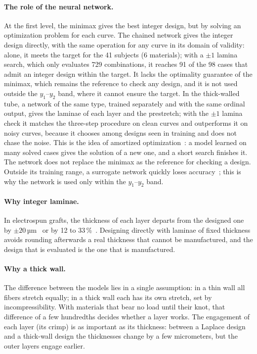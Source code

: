 \paragraph{The role of the neural network.} At the first level, the minimax gives the best integer design, but by solving an optimization problem for each curve. The chained network gives the integer design directly, with the same operation for any curve in its domain of validity: alone, it meets the target for the 41 subjects (6 materials); with a $\pm1$ lamina search, which only evaluates 729 combinations, it reaches 91 of the 98 cases that admit an integer design within the target. It lacks the optimality guarantee of the minimax, which remains the reference to check any design, and it is not used outside the $y_1$--$y_2$ band, where it cannot ensure the target. In the thick-walled tube, a network of the same type, trained separately and with the same ordinal output, gives the laminae of each layer and the prestretch; with the $\pm1$ lamina check it matches the three-step procedure on clean curves and outperforms it on noisy curves, because it chooses among designs seen in training and does not chase the noise. This is the idea of amortized optimization~\cite{amos}: a model learned on many solved cases gives the solution of a new one, and a short search finishes it. The network does not replace the minimax as the reference for checking a design. Outside its training range, a surrogate network quickly loses accuracy~\cite{utrera}; this is why the network is used only within the $y_1$--$y_2$ band.

\paragraph{Why integer laminae.} In electrospun grafts, the thickness of each layer departs from the designed one by $\pm20$\,µm~\cite{harrison} or by 12 to 33\,\%~\cite{tamimi}. Designing directly with laminae of fixed thickness avoids rounding afterwards a real thickness that cannot be manufactured, and the design that is evaluated is the one that is manufactured.

\paragraph{Why a thick wall.} The difference between the models lies in a single assumption: in a thin wall all fibers stretch equally; in a thick wall each has its own stretch, set by incompressibility. With materials that bear no load until their knot, that difference of a few hundredths decides whether a layer works. The engagement of each layer (its crimp) is as important as its thickness: between a Laplace design and a thick-wall design the thicknesses change by a few micrometers, but the outer layers engage earlier.

